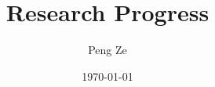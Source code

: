 \documentclass[xcolor=dvipsnames]{beamer}
\title{Research Progress}
\author{Peng Ze}
\institute[NJU CS]{NJU CS}
\date{\today}
\begin{document}
\begin{frame}
  \maketitle
\end{frame}







\begin{frame}
  \printbibliography
\end{frame}
\end{document}
